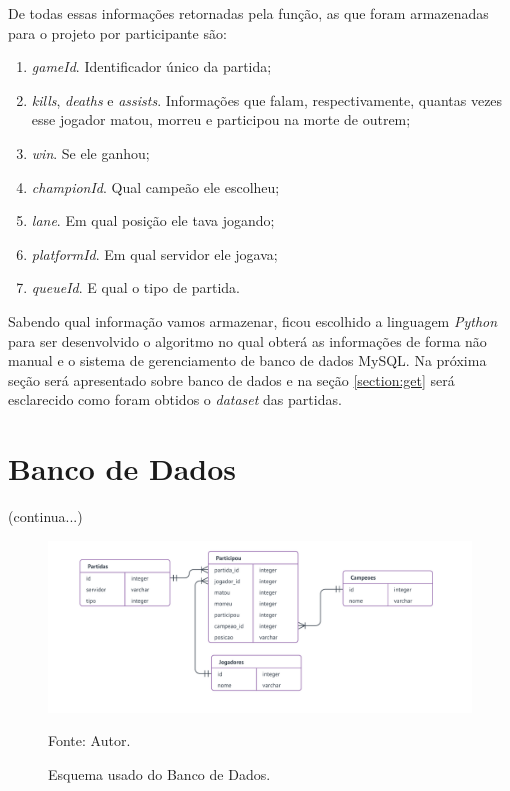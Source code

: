 De todas essas informações retornadas pela função, as que foram armazenadas para o projeto por participante são:

\begin{enumerate}
\item \textit{gameId}. Identificador único da partida;
\item \textit{kills}, \textit{deaths} e \textit{assists}. Informações que falam, respectivamente, quantas vezes esse jogador matou, morreu e participou na morte de outrem;
\item \textit{win}. Se ele ganhou;
\item \textit{championId}. Qual campeão ele escolheu;
\item \textit{lane}. Em qual posição ele tava jogando;
\item \textit{platformId}. Em qual servidor ele jogava;
\item \textit{queueId}. E qual o tipo de partida.
\end{enumerate}

Sabendo qual informação vamos armazenar, ficou escolhido a linguagem \textit{Python} para ser desenvolvido o algoritmo no qual obterá as informações de forma não manual e o sistema de gerenciamento de banco de dados MySQL. Na próxima seção será apresentado sobre banco de dados e na seção \ref{section:get} será esclarecido como foram obtidos o \textit{dataset} das partidas. 


\section{Banco de Dados}
(continua...)
\begin{figure}[H]
	\caption{Esquema usado do Banco de Dados.}
	\begin{center}
		\includegraphics[width=17cm]{imagens/esquema.png}
	\end{center}
	\small{Fonte: Autor.}
	\label{fig:novafigura}
\end{figure}


